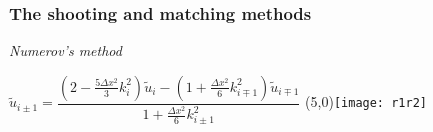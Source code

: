 
\begin{frame}[t]
  \frametitle{The shooting and matching methods}
  \footnotesize
  \emph{Numerov's method}
  
  \vspace{1em}
  $\tilde{u}_{i\pm1} = \dfrac{(2-\frac{5\Delta x^2}{3}k_i^2)\tilde{u}_i - (1+\frac{\Delta x^2}{6}k_{i\mp1}^2)\tilde{u}_{i\mp1}}{1+\frac{\Delta x^2}{6}k_{i\pm1}^2}$
  \Put(5,0){\texttt{[image: r1r2]}} \pause
  
  \vspace{4em}
  \setcounter{subfigure}{0}
  \begin{figure}[h!]
  \centering
  \subfloat[][$E=-0.6$]{\texttt{[image: E06]}} \pause
  \subfloat[][$E=-0.4$]{\texttt{[image: E04]}} \pause
  \subfloat[][$E=-0.5$]{\texttt{[image: E05]}}
  \end{figure}
\end{frame}

